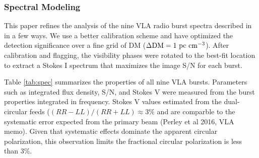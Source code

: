 \documentclass[twocolumn]{aastex61}
\begin{document}
\subsubsection{Spectral Modeling}
\label{sec:spec}

This paper refines the analysis of the nine VLA radio burst spectra described in \citet{LOC} in a few ways. We use a better calibration scheme and have optimized the detection significance over a fine grid of DM ($\Delta \rm{DM}=1\ \rm{pc}\ \rm{cm}^{-3}$). After calibration and flagging, the visibility phases were rotated to the best-fit location \citep[(RA, Dec) $=$ (05h31m58.70s, +33d08m52.5s);][]{LOC} to extract a Stokes I spectrum that maximizes the image S/N for each burst.

Table \ref{tab:spec} summarizes the properties of all nine VLA bursts. Parameters such as integrated flux density, S/N, and Stokes V were measured from the burst properties integrated in frequency. Stokes V values estimated from the dual-circular feeds ($(RR-LL)/(RR+LL)\approx3\%$ and are comparble to the systematic error expected from the primary beam (Perley et al 2016, VLA memo). Given that systematic effects dominate the apparent circular polarization, this observation limits the fractional circular polarization is less than 3\%.
\end{document}
